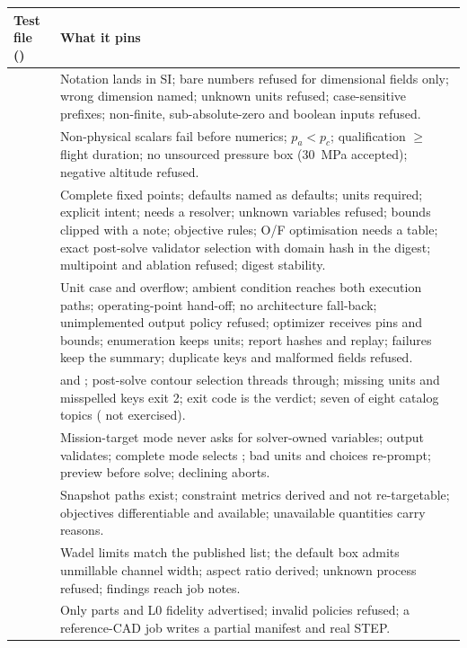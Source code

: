 {\footnotesize
\begin{longtable}{P{4.0cm}P{11.5cm}}
\toprule
Test file () & What it pins \\
\midrule
\endhead
{} & Notation lands in SI; bare numbers refused for dimensional fields only; wrong dimension named; unknown units refused; case-sensitive prefixes; non-finite, sub-absolute-zero and boolean inputs refused. \\
 & Non-physical scalars fail before numerics; $p_a < p_c$; qualification $\geq$ flight duration; no unsourced pressure box (30~MPa accepted); negative altitude refused. \\
 & Complete fixed points; defaults named as defaults; units required; explicit intent;  needs a resolver; unknown variables refused; bounds clipped with a note; objective rules; O/F optimisation needs a table; exact post-solve validator selection with domain hash in the digest; multipoint and ablation refused; digest stability. \\
 & Unit case and overflow; ambient condition reaches both execution paths; operating-point hand-off; no architecture fall-back; unimplemented output policy refused; optimizer receives pins and bounds; enumeration keeps units; report hashes and replay; failures keep the summary; duplicate keys and malformed fields refused. \\
 &  and ; post-solve contour selection threads through; missing units and misspelled keys exit 2;  exit code is the verdict; seven of eight catalog topics ( not exercised). \\
 & Mission-target mode never asks for solver-owned variables; output validates; complete mode selects ; bad units and choices re-prompt; preview before solve; declining aborts. \\
 & Snapshot paths exist; constraint metrics derived and not re-targetable; objectives differentiable and available; unavailable quantities carry reasons. \\
 & Wadel limits match the published list; the default box admits unmillable channel width; aspect ratio derived; unknown process refused; findings reach job notes. \\
 & Only  parts and L0 fidelity advertised; invalid policies refused; a reference-CAD job writes a partial manifest and real STEP. \\
\bottomrule
\end{longtable}}

